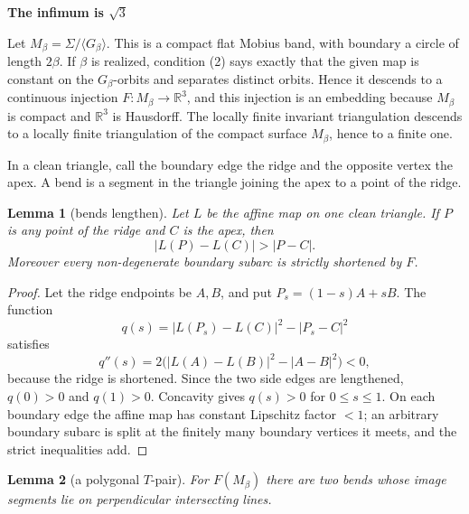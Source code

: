 \documentclass[12pt]{article}
\newtheorem{lemma}{Lemma}
\newcommand{\R}{\mathbb R}
\begin{document}
\begin{center}
{\bf The infimum is \(\sqrt3\)}
\end{center}

Let \(M_\beta=\Sigma/\langle G_\beta\rangle\).  This is a compact flat
Mobius band, with boundary a circle of length \(2\beta\).  If \(\beta\)
is realized, condition (2) says exactly that the given map is constant on
the \(G_\beta\)-orbits and separates distinct orbits.  Hence it descends
to a continuous injection \(F:M_\beta\to\R^3\), and this injection is an
embedding because \(M_\beta\) is compact and \(\R^3\) is Hausdorff.  The
locally finite invariant triangulation descends to a locally finite
triangulation of the compact surface \(M_\beta\), hence to a finite one.

In a clean triangle, call the boundary edge the ridge and the opposite
vertex the apex.  A bend is a segment in the triangle joining the apex to
a point of the ridge.

\begin{lemma}[bends lengthen]\label{lem:lengthen}
Let \(L\) be the affine map on one clean triangle.  If \(P\) is any point
of the ridge and \(C\) is the apex, then
\[
        |L(P)-L(C)|>|P-C|.
\]
Moreover every non-degenerate boundary subarc is strictly shortened by
\(F\).
\end{lemma}

\begin{proof}
Let the ridge endpoints be \(A,B\), and put \(P_s=(1-s)A+sB\).  The
function
\[
 q(s)= |L(P_s)-L(C)|^2-|P_s-C|^2
\]
satisfies
\[
 q''(s)=2\big(|L(A)-L(B)|^2-|A-B|^2\big)<0,
\]
because the ridge is shortened.  Since the two side edges are lengthened,
\(q(0)>0\) and \(q(1)>0\).  Concavity gives \(q(s)>0\) for
\(0\le s\le1\).  On each boundary edge the affine map has constant
Lipschitz factor \(<1\); an arbitrary boundary subarc is split at the
finitely many boundary vertices it meets, and the strict inequalities add.
\end{proof}

\begin{lemma}[a polygonal \(T\)-pair]\label{lem:T}
For \(F(M_\beta)\) there are two bends whose image segments lie on
perpendicular intersecting lines.
\end{lemma}
\end{document}

